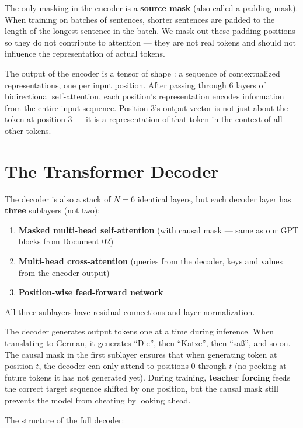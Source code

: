 The only masking in the encoder is a \textbf{source mask} (also called a padding mask). When training on batches of sentences, shorter sentences are padded to the length of the longest sentence in the batch. We mask out these padding positions so they do not contribute to attention --- they are not real tokens and should not influence the representation of actual tokens.

The output of the encoder is a tensor of shape : a sequence of contextualized representations, one per input position. After passing through 6 layers of bidirectional self-attention, each position's representation encodes information from the entire input sequence. Position 3's output vector is not just about the token at position 3 --- it is a representation of that token in the context of all other tokens.

\section{The Transformer Decoder}

The decoder is also a stack of $N = 6$ identical layers, but each decoder layer has \textbf{three} sublayers (not two):

\begin{enumerate}
  \item \textbf{Masked multi-head self-attention} (with causal mask --- same as our GPT blocks from Document 02)
  \item \textbf{Multi-head cross-attention} (queries from the decoder, keys and values from the encoder output)
  \item \textbf{Position-wise feed-forward network}
\end{enumerate}

All three sublayers have residual connections and layer normalization.

The decoder generates output tokens one at a time during inference. When translating to German, it generates ``Die'', then ``Katze'', then ``sa\ss{}'', and so on. The causal mask in the first sublayer ensures that when generating token at position $t$, the decoder can only attend to positions 0 through $t$ (no peeking at future tokens it has not generated yet). During training, \textbf{teacher forcing} feeds the correct target sequence shifted by one position, but the causal mask still prevents the model from cheating by looking ahead.

The structure of the full decoder:

